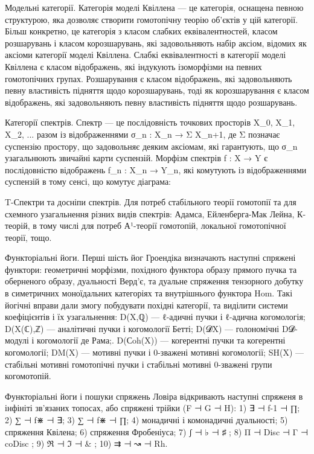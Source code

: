 Модельні категорії. Категорія моделі Квіллена — це категорія, оснащена певною структурою, яка дозволяє створити гомотопічну теорію об'єктів у цій категорії. Більш конкретно, це категорія з класом слабких еквівалентностей, класом розшарувань і класом корозшарувань, які задовольняють набір аксіом, відомих як аксіоми категорії моделі Квіллена. Слабкі еквівалентності в категорії моделі Квіллена є класом відображень, які індукують ізоморфізми на певних гомотопічних групах. Розшарування є класом відображень, які задовольняють певну властивість підняття щодо корозшарувань, тоді як корозшарування є класом відображень, які задовольняють певну властивість підняття щодо розшарувань.

Категорії спектрів. Спектр — це послідовність точкових просторів X_0, X_1, X_2, ... разом із відображеннями σ_n : X_n → Σ X_{n+1}, де Σ позначає суспензію простору, що задовольняє деяким аксіомам, які гарантують, що σ_n узагальнюють звичайні карти суспензій. Морфізм спектрів f : X → Y є послідовністю відображень f_n : X_n → Y_n, які комутують із відображеннями суспензій в тому сенсі, що комутує діаграма:

T-Спектри та досніпи спектрів. Для потреб стабільного теорії гомотопії та для схемного узагальнення різних видів спектрів: Адамса, Ейленберга-Мак Лейна, К-теорій, в тому числі для потреб А¹-теорії гомотопій, локальної гомотопічної теорії, тощо.

Функторіальні йоги. Перші шість йог Гроендіка визначають наступні спряжені функтори: геометричні морфізми, похідного функтора образу прямого пучка та оберненого образу, дуальності Верд'є, та дуальне спряження тензорного добутку в симетричних моноїдальних категоріях та внутрішнього функтора Hom. Такі йогічні вправи дали змогу побудувати похідні категорії, та виділити системи коефіцієнтів і їх узагальнення: D(X,ℚ) — ℓ-адичні пучки і ℓ-адична когомологія; D(X(ℂ),ℤ) — аналітичні пучки і когомології Бетті; D(𝓓X) — голономічні D𝓓-модулі і когомології де Рама;. D(Сoh(X)) — когерентні пучки та когерентні когомології; DM(X) — мотивні пучки і 0-зважені мотивні когомології; SH(X) — стабільні мотивні гомотопічні пучки і стабільні мотивні 0-зважені групи когомотопій.

Функторіальні йоги і пошуки спряжень Ловіра відкривають наступні спряженя в інфініті зв'язаних топосах, або спряжені трійки (F ⊣ G ⊣ H): 1) ∃ ⊣ f-1 ⊣ ∏; 2) ∑ ⊣ f⋇ ⊣ ∃; 3) ∑ ⊣ f⋇ ⊣ ∏; 4) монадичні і комонадичні дуальності; 5) спряження Квілена; 6) спряження Фробеніуса; 7) ʃ ⊣ ♭ ⊣ ♯ ; 8) Π ⊣ Disc ⊣ Γ ⊣ coDisc ; 9) ℜ ⊣ ℑ ⊣ & ; 10) ⇉ ⊣ ↝ ⊣ Rh. 

